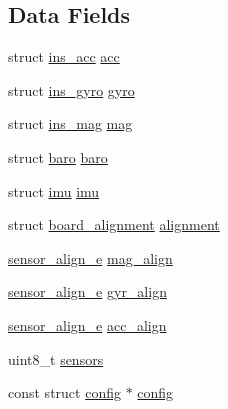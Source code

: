\subsection*{Data Fields}
\begin{DoxyCompactItemize}
\item 
struct \hyperlink{structins__acc}{ins\+\_\+acc} \hyperlink{structinstruments_a1c8aac13bfd266162b6be1a41f4c7713}{acc}
\item 
struct \hyperlink{structins__gyro}{ins\+\_\+gyro} \hyperlink{structinstruments_adc4c5340ce0de66f85a34b6980d4b085}{gyro}
\item 
struct \hyperlink{structins__mag}{ins\+\_\+mag} \hyperlink{structinstruments_a171e6f2339806ab562614c75011b8ef7}{mag}
\item 
struct \hyperlink{structbaro}{baro} \hyperlink{structinstruments_ae29ba41c78afd38395236fe2465994a7}{baro}
\item 
struct \hyperlink{structimu}{imu} \hyperlink{structinstruments_afe040447f1269a7bef886e6011a2c213}{imu}
\item 
struct \hyperlink{structboard__alignment}{board\+\_\+alignment} \hyperlink{structinstruments_ae04c11ada8646187deec24ed2bfb593c}{alignment}
\item 
\hyperlink{sensors_8h_a64e3c71d4562f54f6e168ac1f597dcf8}{sensor\+\_\+align\+\_\+e} \hyperlink{structinstruments_ae19d2556b87015d9f7fe87cfe839af17}{mag\+\_\+align}
\item 
\hyperlink{sensors_8h_a64e3c71d4562f54f6e168ac1f597dcf8}{sensor\+\_\+align\+\_\+e} \hyperlink{structinstruments_ad901b33930311133d1667a275c401190}{gyr\+\_\+align}
\item 
\hyperlink{sensors_8h_a64e3c71d4562f54f6e168ac1f597dcf8}{sensor\+\_\+align\+\_\+e} \hyperlink{structinstruments_a18bdeeda911eb111cea51d78e969f939}{acc\+\_\+align}
\item 
uint8\+\_\+t \hyperlink{structinstruments_a2bed9c659453cb4f77736d16e41fe902}{sensors}
\item 
const struct \hyperlink{structconfig}{config} $\ast$ \hyperlink{structinstruments_a215fcb8b7f6d84b423556162d2e7cbd3}{config}
\end{DoxyCompactItemize}


